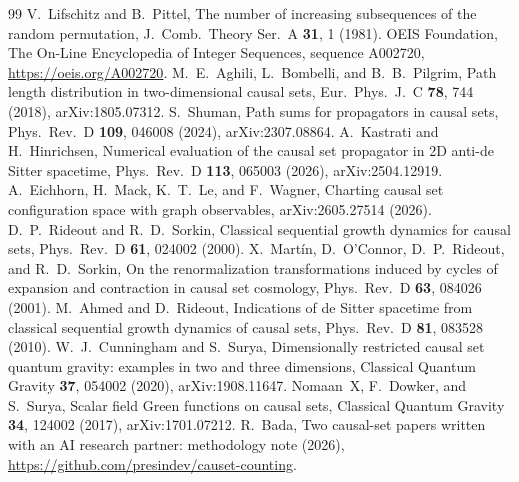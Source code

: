 \documentclass[prd,twocolumn,superscriptaddress,nofootinbib,amsmath,amssymb,floatfix]{revtex4-2}
\begin{document}
\begin{thebibliography}{99}
 V.~Lifschitz and B.~Pittel, The number of increasing subsequences of the random permutation, J.\ Comb.\ Theory Ser.\ A \textbf{31}, 1 (1981).
 OEIS Foundation, The On-Line Encyclopedia of Integer Sequences, sequence A002720, \url{https://oeis.org/A002720}.
 M.~E.~Aghili, L.~Bombelli, and B.~B.~Pilgrim, Path length distribution in two-dimensional causal sets, Eur.\ Phys.\ J.\ C \textbf{78}, 744 (2018), arXiv:1805.07312.
 S.~Shuman, Path sums for propagators in causal sets, Phys.\ Rev.\ D \textbf{109}, 046008 (2024), arXiv:2307.08864.
 A.~Kastrati and H.~Hinrichsen, Numerical evaluation of the causal set propagator in 2D anti-de Sitter spacetime, Phys.\ Rev.\ D \textbf{113}, 065003 (2026), arXiv:2504.12919.
 A.~Eichhorn, H.~Mack, K.~T.~Le, and F.~Wagner, Charting causal set configuration space with graph observables, arXiv:2605.27514 (2026).
 D.~P.~Rideout and R.~D.~Sorkin, Classical sequential growth dynamics for causal sets, Phys.\ Rev.\ D \textbf{61}, 024002 (2000).
 X.~Mart\'in, D.~O'Connor, D.~P.~Rideout, and R.~D.~Sorkin, On the renormalization transformations induced by cycles of expansion and contraction in causal set cosmology, Phys.\ Rev.\ D \textbf{63}, 084026 (2001).
 M.~Ahmed and D.~Rideout, Indications of de Sitter spacetime from classical sequential growth dynamics of causal sets, Phys.\ Rev.\ D \textbf{81}, 083528 (2010).
 W.~J.~Cunningham and S.~Surya, Dimensionally restricted causal set quantum gravity: examples in two and three dimensions, Classical Quantum Gravity \textbf{37}, 054002 (2020), arXiv:1908.11647.
 Nomaan~X, F.~Dowker, and S.~Surya, Scalar field Green functions on causal sets, Classical Quantum Gravity \textbf{34}, 124002 (2017), arXiv:1701.07212.
 R.~Bada, Two causal-set papers written with an AI research partner: methodology note (2026), \url{https://github.com/presindev/causet-counting}.
\end{thebibliography}
\end{document}
